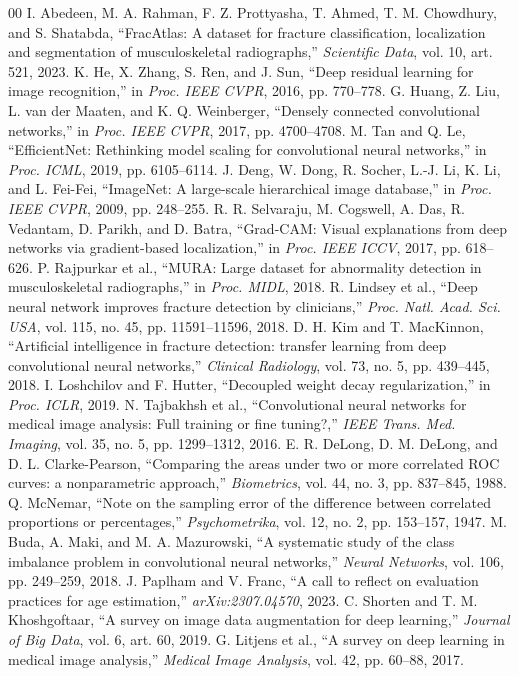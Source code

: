 \documentclass[conference]{IEEEtran}
\begin{document}
\begin{thebibliography}{00}
 I. Abedeen, M. A. Rahman, F. Z. Prottyasha, T. Ahmed, T. M. Chowdhury, and S. Shatabda, ``FracAtlas: A dataset for fracture classification, localization and segmentation of musculoskeletal radiographs,'' \emph{Scientific Data}, vol. 10, art. 521, 2023.
 K. He, X. Zhang, S. Ren, and J. Sun, ``Deep residual learning for image recognition,'' in \emph{Proc. IEEE CVPR}, 2016, pp. 770--778.
 G. Huang, Z. Liu, L. van der Maaten, and K. Q. Weinberger, ``Densely connected convolutional networks,'' in \emph{Proc. IEEE CVPR}, 2017, pp. 4700--4708.
 M. Tan and Q. Le, ``EfficientNet: Rethinking model scaling for convolutional neural networks,'' in \emph{Proc. ICML}, 2019, pp. 6105--6114.
 J. Deng, W. Dong, R. Socher, L.-J. Li, K. Li, and L. Fei-Fei, ``ImageNet: A large-scale hierarchical image database,'' in \emph{Proc. IEEE CVPR}, 2009, pp. 248--255.
 R. R. Selvaraju, M. Cogswell, A. Das, R. Vedantam, D. Parikh, and D. Batra, ``Grad-CAM: Visual explanations from deep networks via gradient-based localization,'' in \emph{Proc. IEEE ICCV}, 2017, pp. 618--626.
 P. Rajpurkar et al., ``MURA: Large dataset for abnormality detection in musculoskeletal radiographs,'' in \emph{Proc. MIDL}, 2018.
 R. Lindsey et al., ``Deep neural network improves fracture detection by clinicians,'' \emph{Proc. Natl. Acad. Sci. USA}, vol. 115, no. 45, pp. 11591--11596, 2018.
 D. H. Kim and T. MacKinnon, ``Artificial intelligence in fracture detection: transfer learning from deep convolutional neural networks,'' \emph{Clinical Radiology}, vol. 73, no. 5, pp. 439--445, 2018.
 I. Loshchilov and F. Hutter, ``Decoupled weight decay regularization,'' in \emph{Proc. ICLR}, 2019.
 N. Tajbakhsh et al., ``Convolutional neural networks for medical image analysis: Full training or fine tuning?,'' \emph{IEEE Trans. Med. Imaging}, vol. 35, no. 5, pp. 1299--1312, 2016.
 E. R. DeLong, D. M. DeLong, and D. L. Clarke-Pearson, ``Comparing the areas under two or more correlated ROC curves: a nonparametric approach,'' \emph{Biometrics}, vol. 44, no. 3, pp. 837--845, 1988.
 Q. McNemar, ``Note on the sampling error of the difference between correlated proportions or percentages,'' \emph{Psychometrika}, vol. 12, no. 2, pp. 153--157, 1947.
 M. Buda, A. Maki, and M. A. Mazurowski, ``A systematic study of the class imbalance problem in convolutional neural networks,'' \emph{Neural Networks}, vol. 106, pp. 249--259, 2018.
 J. Paplham and V. Franc, ``A call to reflect on evaluation practices for age estimation,'' \emph{arXiv:2307.04570}, 2023.
 C. Shorten and T. M. Khoshgoftaar, ``A survey on image data augmentation for deep learning,'' \emph{Journal of Big Data}, vol. 6, art. 60, 2019.
 G. Litjens et al., ``A survey on deep learning in medical image analysis,'' \emph{Medical Image Analysis}, vol. 42, pp. 60--88, 2017.
\end{thebibliography}
\end{document}
